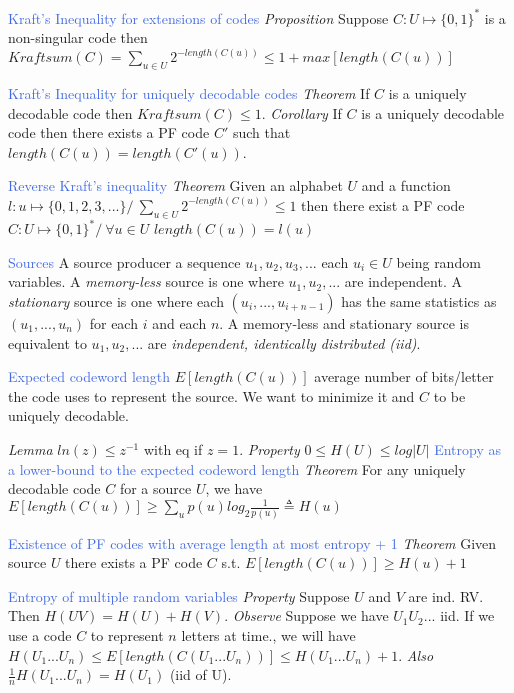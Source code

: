 \documentclass[10pt,a4paper,landscape]{article}
\newcommand{\concept}[1]{\textcolor{RoyalBlue}{#1}}
\newcommand{\subconcept}[1]{\textcolor{PineGreen}{\textit{#1}}}
\renewcommand{\section}[1]{
    \vspace{-0.3cm}
    \begin{center}
      \color{Bittersweet}
      \hrulefill{\small~~#1~~}\hrulefill
    \end{center}
    \vspace{-0.3cm}
  }
\begin{document}
\begin{multicols*}{4}
\concept{Kraft's Inequality for extensions of codes} 
\subconcept{Proposition} Suppose $C:U\mapsto\{0,1\}^*$ is a non-singular code then $Kraftsum(C) = \sum_{u \in U }2^{-length(C(u))} \le 1 + max\left[ length(C(u)) \right]$

\concept{Kraft's Inequality for uniquely decodable codes}
\subconcept{Theorem} If $C$ is a uniquely decodable code then $Kraftsum(C) \le 1$.
\subconcept{Corollary} If $C$ is a uniquely decodable code then there exists a PF code $C'$ such that $length(C(u)) = length(C'(u))$.

\concept{Reverse Kraft's inequality}
\subconcept{Theorem} Given an alphabet $U$ and a function $l:u \mapsto \{0,1,2,3,...\} /\ \sum_{u \in U }2^{-length(C(u))} \le 1$ then there exist a PF code $C:U\mapsto\{0,1\}^* /\ \forall u \in U$ $length(C(u))=l(u) $ 


\concept{Sources} A source producer a sequence $u_1,u_2,u_3,...$ each $u_i \in U$ being random variables.
A \subconcept{memory-less} source is one where $u_1,u_2,...$ are independent.
A \subconcept{stationary} source is one where each $(u_i,...,u_{i+n-1})$ has the same statistics as $(u_1,...,u_n)$ for each $i$ and each $n$.
A memory-less and stationary source is equivalent to $u_1,u_2,...$ are \subconcept{independent, identically distributed (iid)}.

\concept{Expected codeword length}
$E\left[ length(C(u)) \right]$ average number of bits/letter the code uses to represent the source. We want to minimize it and $C$ to be uniquely decodable.


\section{Entropy}
\subconcept{Lemma} $ln(z)\le z^{-1}$ with eq if $z=1$.
\subconcept{Property} $0 \le H(U) \le log |U|$
\concept{Entropy as a lower-bound to the expected codeword length} 
\subconcept{Theorem} For any uniquely decodable code $C$ for a source $U$, we have $E\left[ length(C(u)) \right] \ge \sum_{u}p(u)log_2 \frac{1}{p(u)} \triangleq H(u)$

\concept{Existence of PF codes with average length at most entropy + 1}
\subconcept{Theorem} Given source $U$ there exists a PF code $C$ s.t. 
$E\left[ length(C(u)) \right] \ge H(u)+1$
 
\concept{Entropy of multiple random variables} 
\subconcept{Property} Suppose $U$ and $V$ are ind. RV.
Then $H(UV)=H(U)+H(V)$.
\subconcept{Observe} Suppose we have $U_1U_2...$ iid. If we use a code $C$ to represent $n$ letters at time., we will have $H(U_1...U_n) \le E\left[ length(C(U_1...U_n)) \right] \le H(U_1...U_n)+1$.
\subconcept{Also} $\frac{1}{n} H(U_1...U_n) = H(U_1)$ (iid of U).


\end{multicols*}
\end{document}
